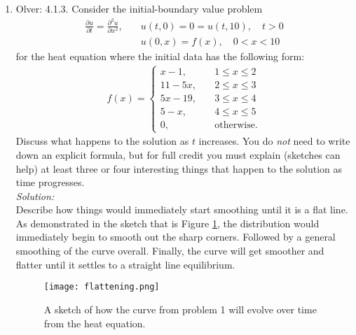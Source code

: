 \documentclass[10pt]{amsart}
\theoremstyle{nonumberplain}
\begin{document}
\begin{enumerate}[label={\bf {\arabic*}:}]
\item Olver: 4.1.3. Consider the initial-boundary value problem
\begin{align*}
\frac {\partial u} {\partial t} = \frac {\partial^2 u}{ \partial x^2}, \quad &u(t, 0) = 0 = u(t, 10), \quad t > 0 \\
	& u(0, x) = f(x), \quad 0 < x < 10
\end{align*}
for the heat equation where the initial data has the following form:
\begin{align*}
f(x) = \begin{cases}
x - 1, \quad &1 \leq x \leq 2 \\
11 - 5x, \quad & 2 \leq x \leq 3 \\
5x - 19, \quad & 3 \leq x \leq 4 \\
5 - x, \quad & 4 \leq x \leq 5 \\
0, \quad &\text{otherwise}.
\end{cases}
\end{align*}
Discuss what happens to the solution as $t$ increases.
You do \textit{not} need to write down an explicit formula, but for full credit you must explain (sketches can help) at least three or four interesting things that happen to the solution as time progresses.
\\

\noindent
\textit{Solution:} \\
Describe how things would immediately start smoothing until it is a flat line.
As demonstrated in the sketch that is Figure \ref{fig:f1}, the distribution would immediately begin to smooth out the sharp corners.
Followed by a general smoothing of the curve overall.
Finally, the curve will get smoother and flatter until it settles to a straight line equilibrium.

\begin{figure}[h]
	\centering
	\texttt{[image: flattening.png]}
 	\caption{A sketch of how the curve from problem 1 will evolve over time from the heat equation.}\label{fig:f1}
\end{figure}

\newpage


\end{enumerate}
\end{document}
